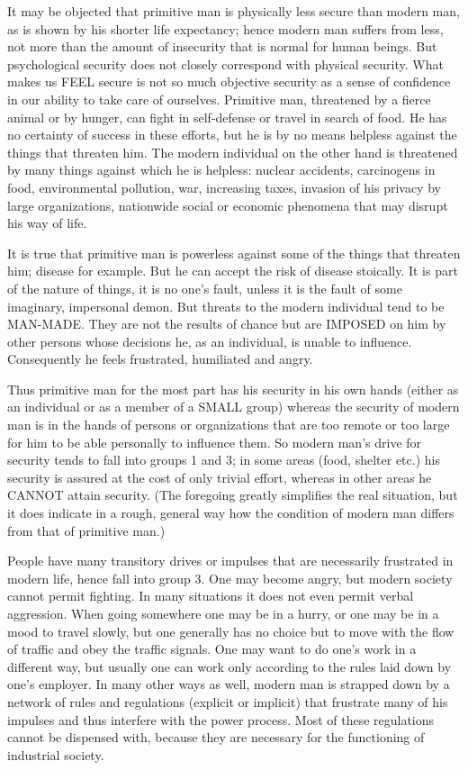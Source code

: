  It may be objected that primitive man is physically less secure than modern man, as is shown by his shorter life expectancy; hence modern man suffers from less, not more than the amount of insecurity that is normal for human beings. But psychological security does not closely correspond with physical security. What makes us FEEL secure is not so much objective security as a sense of confidence in our ability to take care of ourselves. Primitive man, threatened by a fierce animal or by hunger, can fight in self-defense or travel in search of food. He has no certainty of success in these efforts, but he is by no means helpless against the things that threaten him. The modern individual on the other hand is threatened by many things against which he is helpless: nuclear accidents, carcinogens in food, environmental pollution, war, increasing taxes, invasion of his privacy by large organizations, nationwide social or economic phenomena that may disrupt his way of life.

 It is true that primitive man is powerless against some of the things that threaten him; disease for example. But he can accept the risk of disease stoically. It is part of the nature of things, it is no one’s fault, unless it is the fault of some imaginary, impersonal demon. But threats to the modern individual tend to be MAN-MADE. They are not the results of chance but are IMPOSED on him by other persons whose decisions he, as an individual, is unable to influence. Consequently he feels frustrated, humiliated and angry.

 Thus primitive man for the most part has his security in his own hands (either as an individual or as a member of a SMALL group) whereas the security of modern man is in the hands of persons or organizations that are too remote or too large for him to be able personally to influence them. So modern man’s drive for security tends to fall into groups 1 and 3; in some areas (food, shelter etc.) his security is assured at the cost of only trivial effort, whereas in other areas he CANNOT attain security. (The foregoing greatly simplifies the real situation, but it does indicate in a rough, general way how the condition of modern man differs from that of primitive man.)

 People have many transitory drives or impulses that are necessarily frustrated in modern life, hence fall into group 3. One may become angry, but modern society cannot permit fighting. In many situations it does not even permit verbal aggression. When going somewhere one may be in a hurry, or one may be in a mood to travel slowly, but one generally has no choice but to move with the flow of traffic and obey the traffic signals. One may want to do one’s work in a different way, but usually one can work only according to the rules laid down by one’s employer. In many other ways as well, modern man is strapped down by a network of rules and regulations (explicit or implicit) that frustrate many of his impulses and thus interfere with the power process. Most of these regulations cannot be dispensed with, because they are necessary for the functioning of industrial society.

